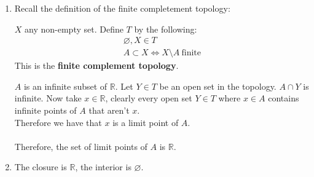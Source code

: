 \documentclass{article}
\newcommand{\R}{\mathbb{R}}
\renewcommand{\emptyset}{\varnothing}
\theoremstyle{remark}
\theoremstyle{example}
\theoremstyle{examples}
\begin{document}
\begin{enumerate}
\begin{enumerate}
			\item Recall the definition of the finite completement topology:\\
			\begin{framed}
				$X$ any non-empty set. Define $T$ by the following:
			\begin{eqnarray}
			\emptyset, X \in T\\
			A \subset X \iff X \setminus A\ \mathrm{finite} 
			\end{eqnarray}
			This is the \textbf{finite complement topology}.
			\end{framed}
			$A$ is an infinite subset of $\R$. Let $Y \in T$ be an open set in the topology. $A \cap Y$ is infinite. Now take $x \in \R$, clearly every open set $Y \in T$ where $x \in A$ contains infinite points of $A$ that aren't $x$.\\
			Therefore we have that $x$ is a limit point of $A$.\\
			\\
			Therefore, the set of limit points of $A$ is $\R$.
			\item The closure is $\R$, the interior is $\emptyset$.
		\end{enumerate}
	\end{enumerate}
\end{document}
